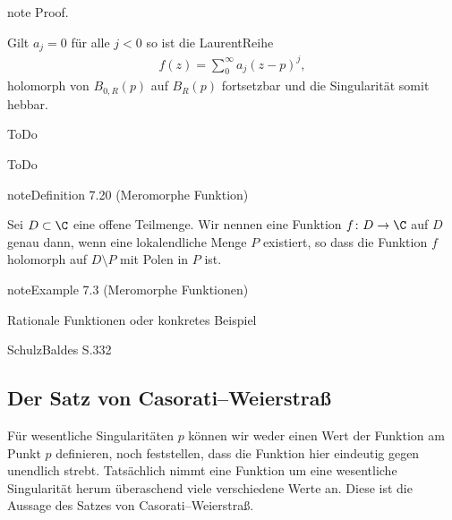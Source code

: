 \documentclass[letterpaper,10pt,german]{jupyterBook}
\begin{document}
\begin{sphinxadmonition}{note}
\sphinxAtStartPar
Proof. 

\sphinxAtStartPar
Gilt \(a_j=0\) für alle \(j<0\) so ist die Laurent\sphinxhyphen{}Reihe
\begin{equation*}
\begin{split}f(z) = \sum_{0}^\infty a_j (z-p)^j,\end{split}
\end{equation*}
\sphinxAtStartPar
holomorph von \(B_{0,R}(p)\) auf \(B_R(p)\) fortsetzbar und die Singularität somit hebbar.

\sphinxAtStartPar
{}

\sphinxAtStartPar
ToDo

\sphinxAtStartPar
{}

\sphinxAtStartPar
ToDo
\end{sphinxadmonition}
\label{complexanalysis/residuensatz:definition-7}
\begin{sphinxadmonition}{note}{Definition 7.20 (Meromorphe Funktion)}



\sphinxAtStartPar
Sei \(D \subset \C\) eine offene Teilmenge.
Wir nennen eine Funktion \(f \colon D \rightarrow \C\)  auf \(D\) genau dann, wenn eine lokalendliche Menge \(P\) existiert, so dass die Funktion \(f\) holomorph auf \(D \setminus P\) mit Polen in \(P\) ist.
\end{sphinxadmonition}
\label{complexanalysis/residuensatz:example-8}
\begin{sphinxadmonition}{note}{Example 7.3 (Meromorphe Funktionen)}



\sphinxAtStartPar
Rationale Funktionen oder konkretes Beispiel

\sphinxAtStartPar
Schulz\sphinxhyphen{}Baldes S.332
\end{sphinxadmonition}


\subsection{Der Satz von Casorati–Weierstraß}
\label{\detokenize{complexanalysis/residuensatz:der-satz-von-casorati-weierstrasz}}
\sphinxAtStartPar
Für wesentliche Singularitäten \(p\) können wir weder einen Wert der Funktion am Punkt \(p\) definieren, noch feststellen, dass die Funktion hier eindeutig gegen unendlich strebt. Tatsächlich nimmt eine Funktion um eine wesentliche Singularität herum überaschend viele verschiedene Werte an. Diese ist die Aussage des Satzes von Casorati–Weierstraß.
\end{document}
